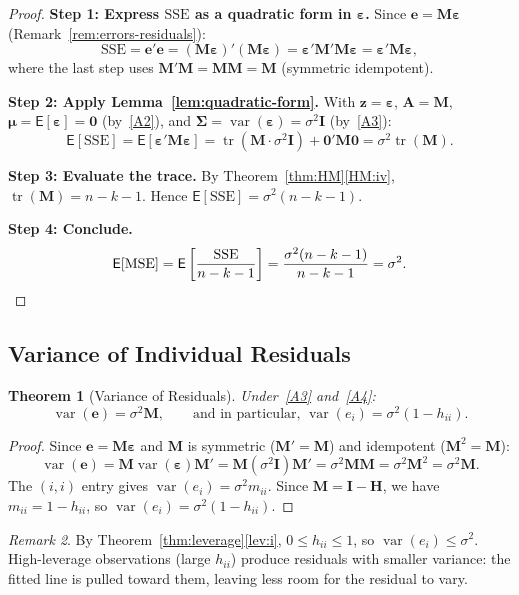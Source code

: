 \documentclass[14pt]{extarticle}
\theoremstyle{plain}
\newtheorem{theorem}{Theorem}[section]
\theoremstyle{definition}
\theoremstyle{remark}
\newtheorem{remark}[theorem]{Remark}
\newcommand\expc{\mathsf{E}}
\DeclareMathOperator\var{var}
\DeclareMathOperator\tr{tr}
\newcommand{\SSE}{\mathrm{SSE}}
\newcommand{\MSE}{\mathrm{MSE}}
\newcommand{\be}{\boldsymbol{\varepsilon}}
\newcommand{\bI}{\mathbf{I}}
\newcommand{\bH}{\mathbf{H}}
\newcommand{\bM}{\mathbf{M}}
\newcommand{\bzero}{\mathbf{0}}
\newcommand{\bz}{\mathbf{z}}
\newcommand{\bA}{\mathbf{A}}
\begin{document}
\begin{proof}
\textbf{Step 1: Express $\SSE$ as a quadratic form in $\be$.} Since $\mathbf{e} = \bM\be$ (Remark~\ref{rem:errors-residuals}):
\[
\SSE = \mathbf{e}'\mathbf{e} = (\bM\be)'(\bM\be) = \be'\bM'\bM\be = \be'\bM\be,
\]
where the last step uses $\bM'\bM = \bM\bM = \bM$ (symmetric idempotent).

\textbf{Step 2: Apply Lemma~\ref{lem:quadratic-form}.} With $\bz = \be$, $\bA = \bM$, $\boldsymbol\mu = \expc[\be] = \bzero$ (by~\ref{A2}), and $\boldsymbol\Sigma = \var(\be) = \sigma^2\bI$ (by~\ref{A3}):
\[
\expc[\SSE] = \expc[\be'\bM\be] = \tr(\bM \cdot \sigma^2\bI) + \bzero'\bM\bzero = \sigma^2\tr(\bM).
\]

\textbf{Step 3: Evaluate the trace.} By Theorem~\ref{thm:HM}\ref{HM:iv}, $\tr(\bM) = n - k - 1$. Hence $\expc[\SSE] = \sigma^2(n - k - 1)$.

\textbf{Step 4: Conclude.}
\[
\expc[\MSE] = \expc\left[\frac{\SSE}{n-k-1}\right] = \frac{\sigma^2(n-k-1)}{n-k-1} = \sigma^2. \qedhere
\]
\end{proof}

\subsection{Variance of Individual Residuals}

\begin{theorem}[Variance of Residuals]\label{thm:var-resid}
Under~\ref{A3} and~\ref{A4}:
\begin{equation}
\var(\mathbf{e}) = \sigma^2\bM, \qquad \text{and in particular, } \var(e_i) = \sigma^2(1 - h_{ii}).
\end{equation}
\end{theorem}

\begin{proof}
Since $\mathbf{e} = \bM\be$ and $\bM$ is symmetric ($\bM' = \bM$) and idempotent ($\bM^2 = \bM$):
\[
\var(\mathbf{e}) = \bM\var(\be)\bM' = \bM(\sigma^2\bI)\bM' = \sigma^2\bM\bM = \sigma^2\bM^2 = \sigma^2\bM.
\]
The $(i, i)$ entry gives $\var(e_i) = \sigma^2 m_{ii}$. Since $\bM = \bI - \bH$, we have $m_{ii} = 1 - h_{ii}$, so $\var(e_i) = \sigma^2(1 - h_{ii})$.
\end{proof}

\begin{remark}\label{rem:var-resid-bound}
By Theorem~\ref{thm:leverage}\ref{lev:i}, $0 \leqslant h_{ii} \leqslant 1$, so $\var(e_i) \leqslant \sigma^2$. High-leverage observations (large $h_{ii}$) produce residuals with smaller variance: the fitted line is pulled toward them, leaving less room for the residual to vary.
\end{remark}
\end{document}
